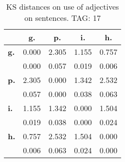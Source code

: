\begin{table}[h!]
\begin{center}
\begin{tabular}{| l || c | c | c | c |}\hline
 & {\bf g.} & {\bf p.} & {\bf i.} & {\bf h.} \\\hline\hline
{\bf g.} & 0.000 & 2.305 & 1.155 & 0.757 \\
{\bf } & 0.000 & 0.057 & 0.019 & 0.006 \\\hline
{\bf p.} & 2.305 & 0.000 & 1.342 & 2.532 \\
{\bf } & 0.057 & 0.000 & 0.038 & 0.063 \\\hline
{\bf i.} & 1.155 & 1.342 & 0.000 & 1.504 \\
{\bf } & 0.019 & 0.038 & 0.000 & 0.024 \\\hline
{\bf h.} & 0.757 & 2.532 & 1.504 & 0.000 \\
{\bf } & 0.006 & 0.063 & 0.024 & 0.000 \\\hline
\end{tabular}
\caption{KS distances on use of adjectives on sentences. TAG: 17}
\end{center}
\end{table}